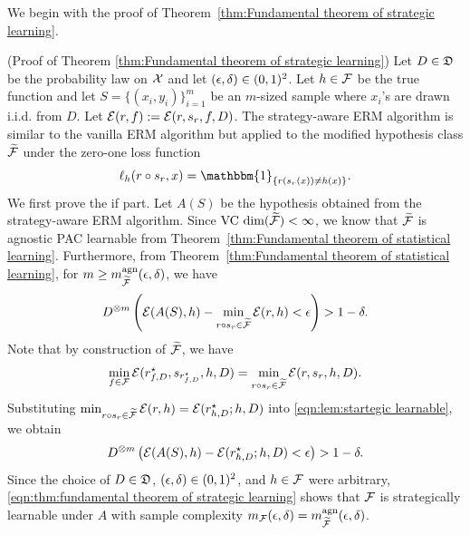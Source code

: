 We begin with the proof of Theorem~\ref{thm:Fundamental theorem of strategic learning}.

\begin{apdxproof}(Proof of Theorem \ref{thm:Fundamental theorem of strategic learning})\label{proof:Fundamental theorem of strategic learning}
Let $D \in \mathfrak{D}$ be the probability law on $\mathcal{X}$ and let $(\epsilon,\delta) \in (0,1)^2$. Let $h \in \mathcal{F}$ be the true function and let $S = \{(x_i,y_i)\}_{i=1}^m$ be an $m$-sized sample where $x_i$'s are drawn i.i.d. from $D$. Let $\mathcal{E}(r,f) := \mathcal{E}(r,s_r,f,D)$. The strategy-aware ERM algorithm is similar to the vanilla ERM algorithm but applied to the modified hypothesis class $\widetilde{\mathcal{F}}$ under the zero-one loss function 
\[
\ell_h(r \circ s_r, x) = \mathbbm{1}_{\{r(s_r(x)) \neq h(x)\}}.
\]
We first prove the if part.
Let $A(S)$ be the hypothesis obtained from the strategy-aware ERM algorithm. Since $\text{VC dim}(\widetilde{\mathcal{F}}) < \infty$, we know that $\widetilde{\mathcal{F}}$ is agnostic PAC learnable from Theorem~\ref{thm:Fundamental theorem of statistical learning}. Furthermore, from Theorem~\ref{thm:Fundamental theorem of statistical learning}, for $m \geq m_{\widetilde{\mathcal{F}}}^{\mathrm{agn}}(\epsilon,\delta)$, we have
\begin{equation}\label{eqn:lem:startegic learnable}
    \begin{aligned}
        D^{\otimes m}\left(\mathcal{E}(A(S), h) - \min_{r \circ s_r \in \widetilde{\mathcal{F}}} \mathcal{E}(r, h) < \epsilon\right) > 1 - \delta.
    \end{aligned}
\end{equation}
Note that by construction of $\widetilde{\mathcal{F}}$, we have
\[
    \min_{f \in \mathcal{F}} \mathcal{E}(r^\star_{f,D}, s_{r^\star_{f,D}}, h, D) = \min_{r \circ s_r \in \widetilde{\mathcal{F}}} \mathcal{E}(r, s_r, h, D).
\]
Substituting $\min_{r \circ s_r \in \widetilde{\mathcal{F}}} \mathcal{E}(r, h) = \mathcal{E}(r^\star_{h,D}; h, D)$ into \eqref{eqn:lem:startegic learnable}, we obtain
\begin{equation}\label{eqn:thm:fundamental theorem of strategic learning}
    \begin{aligned}
        D^{\otimes m}\left(\mathcal{E}(A(S), h) - \mathcal{E}(r^\star_{h,D}; h, D) < \epsilon\right) > 1 - \delta.
    \end{aligned}
\end{equation}
Since the choice of $D \in \mathfrak{D}$, $(\epsilon,\delta) \in (0,1)^2$, and $h \in \mathcal{F}$ were arbitrary, \eqref{eqn:thm:fundamental theorem of strategic learning} shows that $\mathcal{F}$ is strategically learnable under $A$ with sample complexity $m_{\mathcal{F}}(\epsilon,\delta) = m_{\widetilde{\mathcal{F}}}^{\mathrm{agn}}(\epsilon,\delta)$.


\end{apdxproof}
